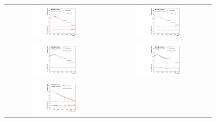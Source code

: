 \begin{figure}[tp!]
\begin{center}
\begin{tabular}{cc}
\includegraphics[width=0.48\textwidth]{Modeling/Figures/defaultcc_tt1cq_top_pt_norm} &
\includegraphics[width=0.48\textwidth]{Modeling/Figures/defaultcc_tt1gccq_top_pt_norm} \\
\includegraphics[width=0.48\textwidth]{Modeling/Figures/defaultcc_tt2cq_top_pt_norm} &
\includegraphics[width=0.48\textwidth]{Modeling/Figures/defaultcc_tt2cq_ttbar_pt_norm} \\
\includegraphics[width=0.48\textwidth]{Modeling/Figures/defaultcc_tt2cq_q1_pt_norm} &

\end{tabular}
\end{center}
\end{figure}
